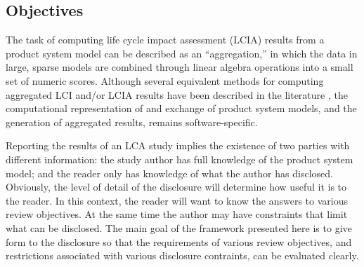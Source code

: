 \subsection{Objectives}

The task of computing life cycle impact assessment (LCIA) results from a product system model can be described as an ``aggregation,'' in which the data in large, sparse models are combined through linear algebra operations into a small set of numeric scores.  Although several equivalent methods for computing aggregated LCI and/or LCIA results have been described in the literature \citep{Suh2005a, Peters_JLCA_2007}, the computational representation of and exchange of product system models, and the generation of aggregated results, remains software-specific.  

Reporting the results of an LCA study implies the existence of two parties with different information: the study author has full knowledge of the product system model; and the reader only has knowledge of what the author has disclosed.  Obviously, the level of detail of the disclosure will determine how useful it is to the reader.  In this context, the reader will want to know the answers to various review objectives.  
At the same time the author may have constraints that limit what can be disclosed.  The main goal of the framework presented here is to give form to the disclosure so that the requirements of various review objectives, and restrictions associated with various disclosure contraints, can be evaluated clearly.

